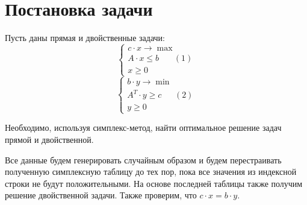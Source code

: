\documentclass[14pt, titlepage,fleqn]{extarticle}
\begin{document}
	

	
	
	\newpage
	
 
	\clearpage
	\section*{Постановка задачи}
	Пусть даны прямая и двойственные задачи:
	\[\begin{cases}
		c \cdot x \rightarrow \max\\
		A\cdot x \leq b ~~~~~~~~(1)\\
		x \geq 0
	\end{cases}\]
	\[\begin{cases}
		b \cdot y \rightarrow \min\\
		A^T\cdot y \geq c ~~~~~~~(2)\\
		y \geq 0
	\end{cases}\]


	Необходимо, используя симплекс-метод, найти оптимальное решение задач прямой и двойственной.


	Все данные будем генерировать случайным образом и будем перестраивать полученную симплексную таблицу до тех пор, пока все значения из индексной строки не будут положительными. На основе последней таблицы также получим решение двойственной задачи. Также проверим, что $c \cdot x = b \cdot y.$
\end{document}
